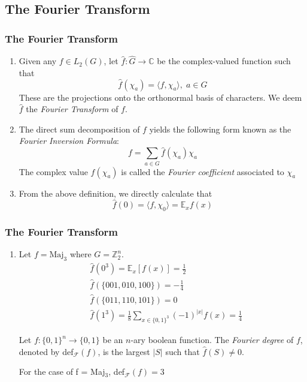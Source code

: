 \documentclass{beamer}
\begin{document}
\subsection{The Fourier Transform}
\begin{frame}
\frametitle{The Fourier Transform}
  \begin{enumerate}
    \item Given any $f \in L_2(G)$, let $\hat{f}: \hat{G} \rightarrow \mathbb{C}$ be the complex-valued function such that
    $$  \hat{f}(\chi_a) =  \langle f, \chi_a \rangle, \; a \in G $$
    These are the projections onto the orthonormal basis of characters. We deem $\hat{f}$ the \emph{Fourier Transform} of $f$.
    \item The direct sum decomposition of $f$ yields the following form known as the \emph{Fourier Inversion Formula}:
    $$  f = \sum_{a \in G} \hat{f}(\chi_a)\chi_a $$
    The complex value $\hat{f}(\chi_a)$ is called the \emph{Fourier coefficient} associated to $\chi_a$
    \item From the above definition, we directly calculate that
    $$  \hat{f}(0) = \langle f, \chi_0 \rangle = \mathbb{E}_x f(x) $$
  \end{enumerate}
\end{frame}

\begin{frame}
\frametitle{The Fourier Transform}
\begin{enumerate}
  \item
  Let $f = \text{Maj}_3$ where $G = \mathbb{Z}_2^n$.
  \begin{align}
    & \hat{f}(0^3) = \mathbb{E}_x[f(x)] = \frac{1}{2} \\
    & \hat{f}(\{001,010,100\}) = - \frac{1}{4} \\
    & \hat{f}(\{011,110,101\}) = 0 \\
    & \hat{f}(1^3) = \frac{1}{8}\sum_{x \in \{0,1\}^3} (-1)^{|x|}f(x) = \frac{1}{4}
  \end{align}
  \begin{definition}
    Let $f:\{0,1\}^n \rightarrow \{0,1\}$ be an $n$-ary boolean function. The \emph{Fourier degree} of $f$, denoted by def$_{\mathcal{F}}(f)$, is the largest $|S|$ such that $\hat{f}(S) \neq 0$.
  \end{definition}
  For the case of f = Maj$_3$, def$_{\mathcal{F}}(f) = 3$
\end{enumerate}
\end{frame}
\end{document}
